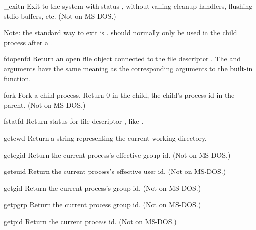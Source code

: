 \begin{funcdesc}{_exit}{n}
Exit to the system with status , without calling cleanup
handlers, flushing stdio buffers, etc.
(Not on MS-DOS.)

Note: the standard way to exit is .
 should normally only be used in the child process
after a .
\end{funcdesc}

\begin{funcdesc}{fdopen}{fd}
Return an open file object connected to the file descriptor .
The  and  arguments have the same meaning as
the corresponding arguments to the built-in  function.
\end{funcdesc}

\begin{funcdesc}{fork}{}
Fork a child process.  Return 0 in the child, the child's process id
in the parent.
(Not on MS-DOS.)
\end{funcdesc}

\begin{funcdesc}{fstat}{fd}
Return status for file descriptor , like .
\end{funcdesc}

\begin{funcdesc}{getcwd}{}
Return a string representing the current working directory.
\end{funcdesc}

\begin{funcdesc}{getegid}{}
Return the current process's effective group id.
(Not on MS-DOS.)
\end{funcdesc}

\begin{funcdesc}{geteuid}{}
Return the current process's effective user id.
(Not on MS-DOS.)
\end{funcdesc}

\begin{funcdesc}{getgid}{}
Return the current process's group id.
(Not on MS-DOS.)
\end{funcdesc}

\begin{funcdesc}{getpgrp}{}
Return the current process group id.
(Not on MS-DOS.)
\end{funcdesc}

\begin{funcdesc}{getpid}{}
Return the current process id.
(Not on MS-DOS.)
\end{funcdesc}

